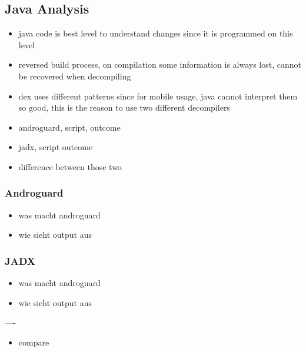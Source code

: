 \subsection{Java Analysis} \label{subsection:forensics-tools-java}
\begin{itemize}
    \item java code is best level to understand changes since it is programmed on this level
    \item reversed build process, on compilation some information is always lost, cannot be recovered when decompiling
    \item dex uses different patterns since for mobile usage, java cannot interpret them so good, this is the reason to use two different decompilers
    \item androguard, script, outcome
    \item jadx, script outcome
    \item difference between those two
\end{itemize}

\subsubsection{Androguard}
\begin{itemize}
  \item was macht androguard
  \item wie sieht output aus
\end{itemize}

\subsubsection{JADX}
\begin{itemize}
  \item was macht androguard
  \item wie sieht output aus
\end{itemize}

----

\begin{itemize}
  \item compare 
\end{itemize}
